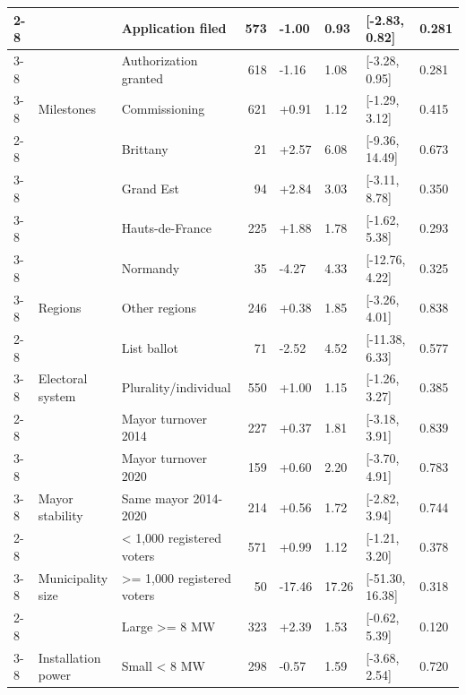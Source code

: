 \begin{ThreePartTable}
\begin{longtable}[t]{lllrllll}
\cmidrule{2-8}\nopagebreak
 &  & Application filed & 573 & -1.00 & 0.93 & {}[-2.83, 0.82] & 0.281\\
\cmidrule{3-8}\nopagebreak
 &  & Authorization granted & 618 & -1.16 & 1.08 & {}[-3.28, 0.95] & 0.281\\
\cmidrule{3-8}\nopagebreak
 & \multirow[t]{-3}{*}{\raggedright\arraybackslash Milestones} & Commissioning & 621 & +0.91 & 1.12 & {}[-1.29, 3.12] & 0.415\\
\cmidrule{2-8}\nopagebreak
 &  & Brittany & 21 & +2.57 & 6.08 & {}[-9.36, 14.49] & 0.673\\
\cmidrule{3-8}\nopagebreak
 &  & Grand Est & 94 & +2.84 & 3.03 & {}[-3.11, 8.78] & 0.350\\
\cmidrule{3-8}\nopagebreak
 &  & Hauts-de-France & 225 & +1.88 & 1.78 & {}[-1.62, 5.38] & 0.293\\
\cmidrule{3-8}\nopagebreak
 &  & Normandy & 35 & -4.27 & 4.33 & {}[-12.76, 4.22] & 0.325\\
\cmidrule{3-8}\nopagebreak
 & \multirow[t]{-5}{*}{\raggedright\arraybackslash Regions} & Other regions & 246 & +0.38 & 1.85 & {}[-3.26, 4.01] & 0.838\\
\cmidrule{2-8}\nopagebreak
 &  & List ballot & 71 & -2.52 & 4.52 & {}[-11.38, 6.33] & 0.577\\
\cmidrule{3-8}\nopagebreak
 & \multirow[t]{-2}{*}{\raggedright\arraybackslash Electoral system} & Plurality/individual & 550 & +1.00 & 1.15 & {}[-1.26, 3.27] & 0.385\\
\cmidrule{2-8}\nopagebreak
 &  & Mayor turnover 2014 & 227 & +0.37 & 1.81 & {}[-3.18, 3.91] & 0.839\\
\cmidrule{3-8}\nopagebreak
 &  & Mayor turnover 2020 & 159 & +0.60 & 2.20 & {}[-3.70, 4.91] & 0.783\\
\cmidrule{3-8}\nopagebreak
 & \multirow[t]{-3}{*}{\raggedright\arraybackslash Mayor stability} & Same mayor 2014-2020 & 214 & +0.56 & 1.72 & {}[-2.82, 3.94] & 0.744\\
\cmidrule{2-8}\nopagebreak
 &  & < 1,000 registered voters & 571 & +0.99 & 1.12 & {}[-1.21, 3.20] & 0.378\\
\cmidrule{3-8}\nopagebreak
 & \multirow[t]{-2}{*}{\raggedright\arraybackslash Municipality size} & >= 1,000 registered voters & 50 & -17.46 & 17.26 & {}[-51.30, 16.38] & 0.318\\
\cmidrule{2-8}\nopagebreak
 &  & Large >= 8 MW & 323 & +2.39 & 1.53 & {}[-0.62, 5.39] & 0.120\\
\cmidrule{3-8}\nopagebreak
 & \multirow[t]{-2}{*}{\raggedright\arraybackslash Installation power} & Small < 8 MW & 298 & -0.57 & 1.59 & {}[-3.68, 2.54] & 0.720\\

\end{longtable}
\end{ThreePartTable}
